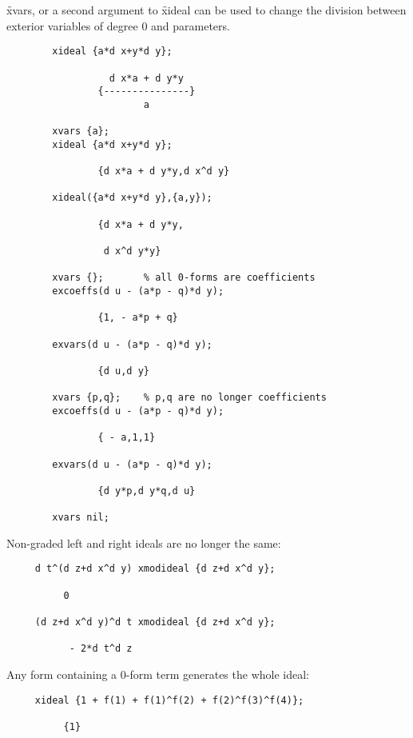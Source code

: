 \f{xvars}, or a second argument to \f{xideal} can be used to change the
division between exterior variables of degree 0 and parameters.
\begin{verbatim}
        xideal {a*d x+y*d y};

                  d x*a + d y*y
                {---------------}
                        a

        xvars {a};
        xideal {a*d x+y*d y};
 
                {d x*a + d y*y,d x^d y}
 
        xideal({a*d x+y*d y},{a,y});
 
                {d x*a + d y*y,
 
                 d x^d y*y}
 
        xvars {};       % all 0-forms are coefficients
        excoeffs(d u - (a*p - q)*d y);
        
                {1, - a*p + q}
        
        exvars(d u - (a*p - q)*d y);

                {d u,d y}

        xvars {p,q};    % p,q are no longer coefficients
        excoeffs(d u - (a*p - q)*d y);
        
                { - a,1,1}

        exvars(d u - (a*p - q)*d y);

                {d y*p,d y*q,d u}

        xvars nil;
\end{verbatim}


Non-graded left and right ideals are no longer the same:
\begin{verbatim}
     d t^(d z+d x^d y) xmodideal {d z+d x^d y};

          0

     (d z+d x^d y)^d t xmodideal {d z+d x^d y};

           - 2*d t^d z
\end{verbatim}
Any form containing a 0-form term generates the whole ideal:
\begin{verbatim}
     xideal {1 + f(1) + f(1)^f(2) + f(2)^f(3)^f(4)};

          {1}
\end{verbatim}


